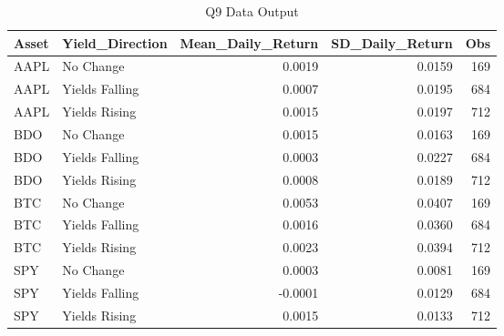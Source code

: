 \begin{table}[H]
\centering
\caption{Q9 Data Output}
\label{tab:q9}
\begin{tabular}{llrrr}
\toprule
Asset & Yield\_Direction & Mean\_Daily\_Return & SD\_Daily\_Return & Obs \\
\midrule
AAPL & No Change & 0.0019 & 0.0159 & 169 \\
AAPL & Yields Falling & 0.0007 & 0.0195 & 684 \\
AAPL & Yields Rising & 0.0015 & 0.0197 & 712 \\
BDO & No Change & 0.0015 & 0.0163 & 169 \\
BDO & Yields Falling & 0.0003 & 0.0227 & 684 \\
BDO & Yields Rising & 0.0008 & 0.0189 & 712 \\
BTC & No Change & 0.0053 & 0.0407 & 169 \\
BTC & Yields Falling & 0.0016 & 0.0360 & 684 \\
BTC & Yields Rising & 0.0023 & 0.0394 & 712 \\
SPY & No Change & 0.0003 & 0.0081 & 169 \\
SPY & Yields Falling & -0.0001 & 0.0129 & 684 \\
SPY & Yields Rising & 0.0015 & 0.0133 & 712 \\
\bottomrule
\end{tabular}
\end{table}
